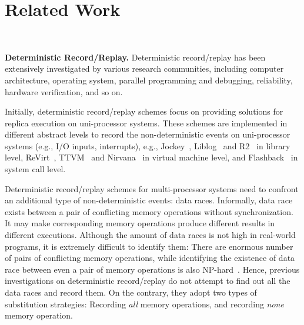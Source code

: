 \documentclass[10pt,onecolumn,letterpaper]{article}
\begin{document}
\section{Related Work}~\label{sec:related}

\noindent\textbf{Deterministic Record/Replay.} Deterministic
record/replay has been extensively investigated by various research
communities, including computer architecture, operating system,
parallel programming and debugging, reliability, hardware
verification, and so on.

Initially, deterministic record/replay schemes focus on providing
solutions for replica execution on uni-processor systems. These
schemes are implemented in different abstract levels to record the
non-deterministic events on uni-processor systems (e.g., I/O inputs,
interrupts), e.g., Jockey~\cite{Saito05AADEBUG},
Liblog~\cite{Geels06ATC} and R2~\cite{Guo08OSDI} in library level,
ReVirt~\cite{Dunlap02OSDI}, TTVM~\cite{King05ATEC} and
Nirvana~\cite{Bhansali06VEE} in virtual machine level, and
Flashback~\cite{Srinivasan04ATC} in system call level.

Deterministic record/replay schemes for multi-processor systems need
to confront an additional type of non-deterministic events: data
races. Informally, data race exists between a pair of conflicting
memory operations without synchronization. It may make corresponding
memory operations produce different results in different executions.
Although the amount of data races is not high in real-world
programs, it is extremely difficult to identify them: There are
enormous number of pairs of conflicting memory operations, while
identifying the existence of data race between even a pair of memory
operations is also NP-hard~\cite{Netzer90ICPP}. Hence, previous
investigations on deterministic record/replay do not attempt to find
out all the data races and record them. On the contrary, they adopt
two types of substitution strategies: Recording \emph{all} memory
operations, and recording \emph{none} memory operation.
\end{document}
